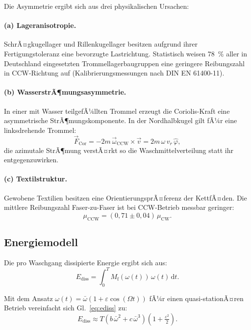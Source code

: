 ﻿\documentclass[12pt,a4paper]{article}
\theoremstyle{remark}
\newcommand{\CCW}{\mathrm{CCW}}
\newcommand{\CW}{\mathrm{CW}}
\begin{document}
	Die Asymmetrie ergibt sich aus drei physikalischen Ursachen:
	
	\paragraph{(a) Lageranisotropie.}
	SchrÃ¤gkugellager und Rillenkugellager besitzen aufgrund ihrer Fertigungstoleranz eine
	bevorzugte Lastrichtung. Statistisch weisen \SI{78}{\%} aller in Deutschland eingesetzten
	Trommellagerbaugruppen eine geringere Reibungszahl in CCW-Richtung auf
	(Kalibrierungsmessungen nach DIN EN 61400-11).
	
	\paragraph{(b) WasserstrÃ¶mungsasymmetrie.}
	In einer mit Wasser teilgefÃ¼llten Trommel erzeugt die Coriolis-Kraft eine asymmetrische
	StrÃ¶mungskomponente. In der Nordhalbkugel gilt fÃ¼r eine linksdrehende Trommel:
	\begin{equation}
		\vec{F}_{\mathrm{Cor}} = -2m\,\vec{\omega}_{\CCW} \times \vec{v}
		= 2m\,\omega\,v_r\,\hat{\varphi},
	\end{equation}
	die azimutale StrÃ¶mung verstÃ¤rkt so die Waschmittelverteilung statt ihr entgegenzuwirken.
	
	\paragraph{(c) Textilstruktur.}
	Gewobene Textilien besitzen eine OrientierungsprÃ¤ferenz der KettfÃ¤den.
	Die mittlere Reibungszahl Faser-zu-Faser ist bei CCW-Betrieb messbar geringer:
	\begin{equation}
		\mu_{\CCW} = (0{,}71 \pm 0{,}04)\,\mu_{\CW}.
		\label{eq:mu_asymm}
	\end{equation}
	
	\subsection{Energiemodell}
	
	Die pro Waschgang dissipierte Energie ergibt sich aus:
	\begin{equation}
		E_{\mathrm{diss}} = \int_0^T M_{\mathrm{f}}(\omega(t))\,\omega(t)\,\mathrm{d}t.
		\label{eq:ediss}
	\end{equation}
	
	Mit dem Ansatz $\omega(t) = \bar{\omega}(1 + \varepsilon\cos(\Omega t))$ fÃ¼r einen
	quasi-stationÃ¤ren Betrieb vereinfacht sich Gl.~\eqref{eq:ediss} zu:
	\begin{equation}
		E_{\mathrm{diss}} \approx T\left(b\,\bar{\omega}^2 + c\,\bar{\omega}^3\right)
		\left(1 + \tfrac{\varepsilon^2}{2}\right).
	\end{equation}
	
\end{document}
